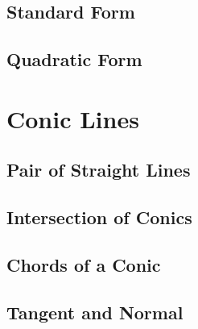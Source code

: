 \documentclass[11pt]{book}
\begin{document}
\section{Standard Form}

\section{Quadratic Form }


\chapter{Conic Lines}
\section{Pair of Straight Lines}
%

\section{Intersection of Conics}

\section{ Chords of a Conic}

\section{ Tangent and Normal}

\fi
%

%
%
%
\latexprintindex
\end{document}
